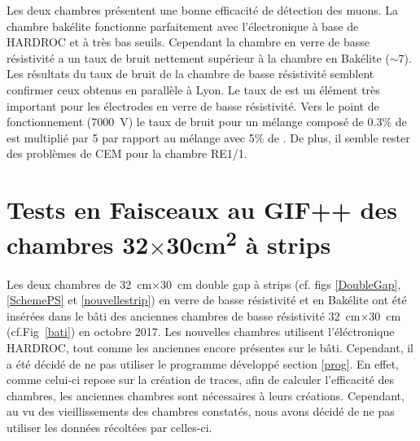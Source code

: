 Les deux chambres présentent une bonne efficacité de détection des muons. La chambre bakélite fonctionne parfaitement avec l'électronique à base de HARDROC et à très bas seuils. Cependant la chambre en verre de basse résistivité a un taux de bruit nettement supérieur à la chambre en Bakélite ($\sim$\num{7}). Les résultats du taux de bruit de la chambre de basse résistivité semblent confirmer ceux obtenus en parallèle à Lyon. Le taux de  est un élément très important pour les électrodes en verre de basse résistivité. Vers le point de fonctionnement (\SI{7000}{\volt}) le taux de bruit pour un mélange composé de \num{0.3}\% de  est multiplié par \num{5} par rapport au mélange avec \num{5}\% de . De plus, il semble rester des problèmes de CEM pour la chambre RE1/1.


\section{Tests en Faisceaux au GIF++ des chambres \texorpdfstring{\num{32}$\times$\num{30}\si{\square\centi\meter}}{30cm x 30cm} à strips}
\label{smallchamber}

Les deux chambres de \SI{32}{\centi\meter}$\times$\SI{30}{\centi\meter} double gap à strips (cf. figs \ref{DoubleGap}, \ref{SchemePS} et \ref{nouvellestrip}) en verre de basse résistivité et en Bakélite ont été insérées dans le bâti des anciennes chambres de basse résistivité \SI{32}{\centi\meter}$\times$\SI{30}{\centi\meter} (cf.Fig~\ref{bati}) en octobre 2017. Les nouvelles chambres utilisent l'éléctronique HARDROC, tout comme les anciennes encore présentes sur le bâti. Cependant, il a été décidé de ne pas utiliser le programme développé section \ref{prog}. En effet, comme celui-ci repose sur la création de traces, afin de calculer l'efficacité des chambres, les anciennes chambres sont nécessaires à leurs créations. Cependant, au vu des vieillissements des chambres constatés, nous avons décidé de ne pas utiliser les données récoltées par celles-ci.

